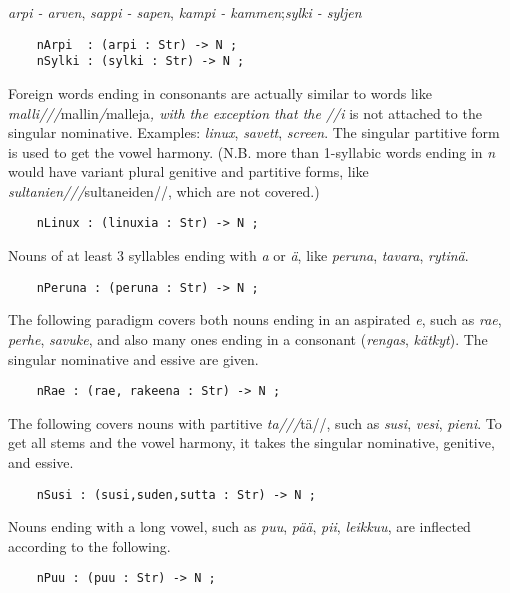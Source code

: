 \documentclass[11pt,a4paper]{article}
\begin{document}
\textit{arpi - arven}, \textit{sappi - sapen}, \textit{kampi - kammen};\textit{sylki - syljen}

\begin{verbatim}
    nArpi  : (arpi : Str) -> N ;
    nSylki : (sylki : Str) -> N ;
\end{verbatim}

Foreign words ending in consonants are actually similar to words like
\textit{malli///}mallin\textit{/}malleja\textit{, with the exception that the //i} is not attached
to the singular nominative. Examples: \textit{linux}, \textit{savett}, \textit{screen}.
The singular partitive form is used to get the vowel harmony. (N.B. more than 
1-syllabic words ending in \textit{n} would have variant plural genitive and 
partitive forms, like \textit{sultanien///}sultaneiden//, which are not covered.)

\begin{verbatim}
    nLinux : (linuxia : Str) -> N ;
\end{verbatim}

Nouns of at least 3 syllables ending with \textit{a} or \textit{ä}, like \textit{peruna}, \textit{tavara},
\textit{rytinä}.

\begin{verbatim}
    nPeruna : (peruna : Str) -> N ;
\end{verbatim}

The following paradigm covers both nouns ending in an aspirated \textit{e}, such as
\textit{rae}, \textit{perhe}, \textit{savuke}, and also many ones ending in a consonant
(\textit{rengas}, \textit{kätkyt}). The singular nominative and essive are given.

\begin{verbatim}
    nRae : (rae, rakeena : Str) -> N ;
\end{verbatim}

The following covers nouns with partitive \textit{ta///}tä//, such as
\textit{susi}, \textit{vesi}, \textit{pieni}. To get all stems and the vowel harmony, it takes
the singular nominative, genitive, and essive.

\begin{verbatim}
    nSusi : (susi,suden,sutta : Str) -> N ;
\end{verbatim}

Nouns ending with a long vowel, such as \textit{puu}, \textit{pää}, \textit{pii}, \textit{leikkuu},
are inflected according to the following.

\begin{verbatim}
    nPuu : (puu : Str) -> N ;
\end{verbatim}
\end{document}
